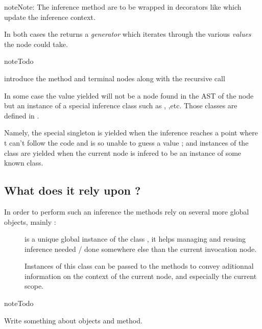 \documentclass[letterpaper,10pt,english]{sphinxmanual}
\begin{document}
\begin{notice}{note}{Note:}
The inference method are to be wrapped in decorators like
 which update the inference context.
\end{notice}

In both cases the  returns a \emph{generator} which iterates
through the various \emph{values} the node could take.

\begin{notice}{note}{Todo}

introduce the {\hyperref[inference:inference.infer_end]{}} method and
terminal nodes along with the recursive call
\end{notice}

In some case the value yielded will not be a node found in the AST of the node
but an instance of a special inference class such as ,
,etc. Those classes are defined in .

Namely, the special singleton  is yielded when the inference reaches
a point where t can't follow the code and is so unable to guess a value ; and
instances of the  class are yielded when the current node is
infered to be an instance of some known class.


\subsection{What does it rely upon ?}
\label{inference:what-does-it-rely-upon}
In order to perform such an inference the  methods rely
on several more global objects, mainly :
\begin{description}
\item[{}] \leavevmode
is a unique global instance of the class ,
it helps managing and reusing inference needed / done somewhere
else than the current invocation node.

\item[{}] \leavevmode
Instances of this class can be passed to the  methods
to convey aditionnal information on the context of the current
node, and especially the current scope.

\end{description}

\begin{notice}{note}{Todo}

Write something about  objects and
 method.
\end{notice}
\end{document}
